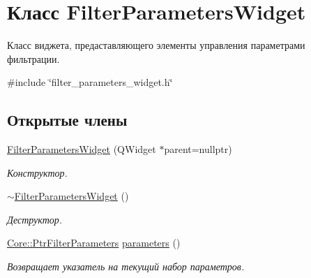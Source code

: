 \hypertarget{class_filter_parameters_widget}{}\section{Класс Filter\+Parameters\+Widget}
\label{class_filter_parameters_widget}


Класс виджета, предаставляющего элементы управления параметрами фильтрации.  




{\ttfamily \#include \char`\"{}filter\+\_\+parameters\+\_\+widget.\+h\char`\"{}}

\subsection*{Открытые члены}
\begin{DoxyCompactItemize}
\item 
\hypertarget{class_filter_parameters_widget_ade6b317bb498ff3785cbf380ada8b214}{}\label{class_filter_parameters_widget_ade6b317bb498ff3785cbf380ada8b214} 
\hyperlink{class_filter_parameters_widget_ade6b317bb498ff3785cbf380ada8b214}{Filter\+Parameters\+Widget} (Q\+Widget $\ast$parent=nullptr)
\begin{DoxyCompactList}\small\item\em Конструктор. \end{DoxyCompactList}\item 
\hypertarget{class_filter_parameters_widget_ab3394a4f66caf8faa7886b55bba647e1}{}\label{class_filter_parameters_widget_ab3394a4f66caf8faa7886b55bba647e1} 
\hyperlink{class_filter_parameters_widget_ab3394a4f66caf8faa7886b55bba647e1}{$\sim$\+Filter\+Parameters\+Widget} ()
\begin{DoxyCompactList}\small\item\em Деструктор. \end{DoxyCompactList}\item 
\hypertarget{class_filter_parameters_widget_a39ed363f640272273b3e4eb82bc75a21}{}\label{class_filter_parameters_widget_a39ed363f640272273b3e4eb82bc75a21} 
\hyperlink{namespace_core_a4811af8148ba137d644b9a61a042cf03}{Core\+::\+Ptr\+Filter\+Parameters} \hyperlink{class_filter_parameters_widget_a39ed363f640272273b3e4eb82bc75a21}{parameters} ()
\begin{DoxyCompactList}\small\item\em Возвращает указатель на текущий набор параметров. \end{DoxyCompactList}\end{DoxyCompactItemize}
